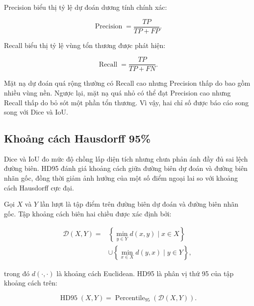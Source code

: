 Precision biểu thị tỷ lệ dự đoán dương tính chính xác:

\begin{equation}
    \operatorname{Precision}
    =
    \frac{TP}{TP+FP}.
    \label{eq:precision}
\end{equation}

Recall biểu thị tỷ lệ vùng tổn thương được phát hiện:

\begin{equation}
    \operatorname{Recall}
    =
    \frac{TP}{TP+FN}.
    \label{eq:recall}
\end{equation}

Mặt nạ dự đoán quá rộng thường có Recall cao nhưng Precision thấp do bao gồm nhiều vùng nền. Ngược lại, mặt nạ quá nhỏ có thể đạt Precision cao nhưng Recall thấp do bỏ sót một phần tổn thương. Vì vậy, hai chỉ số được báo cáo song song với Dice và IoU.

\subsection{Khoảng cách Hausdorff 95\%}
\label{subsec:hd95}

Dice và IoU đo mức độ chồng lấp diện tích nhưng chưa phản ánh đầy đủ sai lệch đường biên. HD95 đánh giá khoảng cách giữa đường biên dự đoán và đường biên nhãn gốc, đồng thời giảm ảnh hưởng của một số điểm ngoại lai so với khoảng cách Hausdorff cực đại.

Gọi $X$ và $Y$ lần lượt là tập điểm trên đường biên dự đoán và đường biên nhãn gốc. Tập khoảng cách biên hai chiều được xác định bởi:

\begin{equation}
    \begin{split}
    \mathcal{D}(X,Y)
    ={}&
    \left\{
        \min_{y\in Y}d(x,y)
        \mid x\in X
    \right\}
    \\
    &\cup
    \left\{
        \min_{x\in X}d(y,x)
        \mid y\in Y
    \right\},
    \end{split}
    \label{eq:surface_distances}
\end{equation}

trong đó $d(\cdot,\cdot)$ là khoảng cách Euclidean. HD95 là phân vị thứ 95 của tập khoảng cách trên:

\begin{equation}
    \operatorname{HD95}(X,Y)
    =
    \operatorname{Percentile}_{95}
    \left(
        \mathcal{D}(X,Y)
    \right).
    \label{eq:hd95}
\end{equation}

